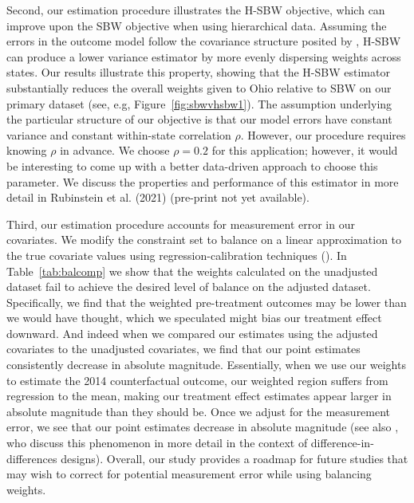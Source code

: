\documentclass[aoas]{imsart}
\theoremstyle{plain}
\theoremstyle{remark}
\begin{document}
Second, our estimation procedure illustrates the H-SBW objective, which can improve upon the SBW objective when using hierarchical data. Assuming the errors in the outcome model follow the covariance structure posited by \cite{kloek1981ols}, H-SBW can produce a lower variance estimator by more evenly dispersing weights across states. Our results illustrate this property, showing that the H-SBW estimator substantially reduces the overall weights given to Ohio relative to SBW on our primary dataset (see, e.g, Figure~\ref{fig:sbwvhsbw1}). The assumption underlying the particular structure of our objective is that our model errors have constant variance and constant within-state correlation $\rho$. However, our procedure requires knowing $\rho$ in advance. We choose $\rho = 0.2$ for this application; however, it would be interesting to come up with a better data-driven approach to choose this parameter. We discuss the properties and performance of this estimator in more detail in Rubinstein et al. (2021) (pre-print not yet available).

Third, our estimation procedure accounts for measurement error in our covariates. We modify the constraint set to balance on a linear approximation to the true covariate values using regression-calibration techniques (\cite{gleser1992importance}). In Table~\ref{tab:balcomp} we show that the weights calculated on the unadjusted dataset fail to achieve the desired level of balance on the adjusted dataset. Specifically, we find that the weighted pre-treatment outcomes may be lower than we would have thought, which we speculated might bias our treatment effect downward. And indeed when we compared our estimates using the adjusted covariates to the unadjusted covariates, we find that our point estimates consistently decrease in absolute magnitude. Essentially, when we use our weights to estimate the 2014 counterfactual outcome, our weighted region suffers from regression to the mean, making our treatment effect estimates appear larger in absolute magnitude than they should be. Once we adjust for the measurement error, we see that our point estimates decrease in absolute magnitude (see also \cite{daw2018matching}, who discuss this phenomenon in more detail in the context of difference-in-differences designs). Overall, our study provides a roadmap for future studies that may wish to correct for potential measurement error while using balancing weights. 
\end{document}
